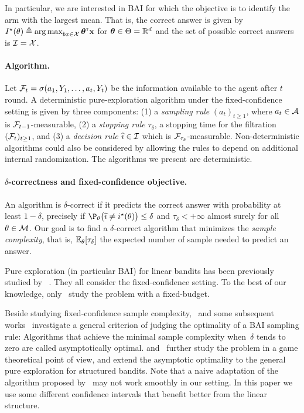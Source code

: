 In particular, we are interested in BAI for which the objective is to identify the arm with the largest mean. That is, the correct answer is given by $I^\star(\theta) \triangleq \operatorname*{arg\,max}_{bx\in\mathcal{X}} {\boldsymbol \theta}^\mathsf{\scriptscriptstyle T}{\bf x}$ for ${\boldsymbol \theta}\in\Theta = \mathbb{R}^d$ and the set of possible correct answers is $\mathcal{I} = \mathcal{X}$.

\paragraph{Algorithm.}
Let $\mathcal{F}_{t}=\sigma (a_1,Y_1,\ldots, a_t,Y_t)$ be the information available to the agent after $t$ round. A deterministic pure-exploration algorithm under the fixed-confidence setting is given by three components: (1) a \emph{sampling rule} $(a_t)_{t\geq 1}$, where $a_t\in\mathcal{A}$ is $\mathcal{F}_{t-1}$-measurable, (2) a \emph{stopping rule} $\tau_\delta$, a stopping time for the filtration $(\mathcal{F}_t)_{t\geq 1}$, and (3) a \emph{decision rule} $\widehat{\imath}\in \mathcal{I}$ which is $\mathcal{F}_{\tau_\delta}$-measurable.
Non-deterministic algorithms could also be considered by allowing the rules to depend on additional internal randomization. The algorithms we present are deterministic.

\paragraph{$\delta$-correctness and fixed-confidence objective.}
An algorithm is $\delta$-correct if it predicts the correct answer with probability at least $1-\delta$, precisely if $\P_\theta \big(\hi \neq \istar(\theta)\big) \leq \delta$ and $\tau_\delta < +\infty$ almost surely for all $\theta \in\mathcal{M}$. Our goal is to find a $\delta$-correct algorithm that minimizes the \emph{sample complexity}, that is,  $\mathbb{E}_\theta[\tau_\delta]$ the expected number of sample needed to predict an answer.

Pure exploration (in particular BAI) for linear bandits has been previously studied by
~\citet{soare2014linear,tao2018alba,xu2018linear,zaki2019maxoverlap,fiez2019transductive,kazerouni2019glb}. They all consider the fixed-confidence setting. To the best of our knowledge, only~\citet{hoffman2014bayesgap} study the problem with a fixed-budget.

Beside studying fixed-confidence sample complexity,~\citet{garivier2016tracknstop} and some subsequent works~\citep{qin2017ttei,shang2020t3c} investigate a general criterion of judging the optimality of a BAI sampling rule: Algorithms that achieve the minimal sample complexity when~$\delta$ tends to zero are called asymptotically optimal. \citet{menard2019lma} and~\citet{degenne2019game} further study the problem in a game theoretical point of view, and extend the asymptotic optimality to the general pure exploration for structured bandits. Note that a naive adaptation of the algorithm proposed by~\citet{degenne2019game} may not work smoothly in our setting. In this paper we use some different confidence intervals that benefit better from the linear structure.

